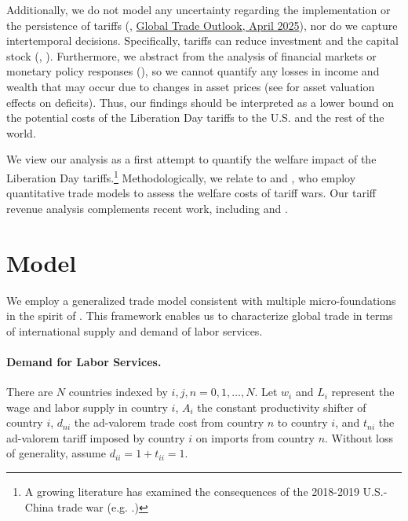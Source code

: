 \documentclass[12pt]{article}
\begin{document}
Additionally, we do not model any uncertainty regarding the implementation or the persistence of tariffs (\citet{alessandria2025trade}, \href{https://www.wto.org/english/res_e/booksp_e/trade_outlook25_e.pdf}{Global Trade Outlook, April 2025}), nor do we capture intertemporal decisions. Specifically, tariffs can reduce investment and the capital stock (\citet{cunat2024bilateral}, \citet{ NBERw33702}). Furthermore, we abstract from the analysis of financial markets or monetary policy responses (\citet{bianchi,sebnem, monacelli2025tariffs}), so we cannot quantify any losses in income and wealth that may occur due to changes in asset prices (see \citet{oleg_dima_deficit} for asset valuation effects on deficits). Thus, our findings should be interpreted as a lower bound on the potential costs of the Liberation Day tariffs to the U.S. and the rest of the world. 

We view our analysis as a first attempt to quantify the welfare impact of the Liberation Day tariffs.\footnote{A growing literature has examined the consequences of the 2018-2019 U.S.-China trade war (e.g. \citet{amiti2019impact,amiti2020s, flaaen2019disentangling,waugh2019consumption,fajgelbaum2020return,ma2021eye,ma2025tariffs,caliendo2023lessons}.)} Methodologically, we relate to \cite{Ossa} and \cite{Lashkaripour_tariff_war}, who employ quantitative trade models to assess the welfare costs of tariff wars. Our tariff revenue analysis complements recent work, including \cite{Lashkaripour_jeea} and \cite{Alessandria_revenue2025}.

\section{Model}
We employ a generalized trade model consistent with multiple micro-foundations in the spirit of \citet{demidova2024small}. This framework enables us to characterize global trade in terms of international supply and demand of labor services. 

\paragraph{Demand for Labor Services.}
There are $N $ countries indexed by $i,j,n = 0,1,\dots,N$. Let $w_i$ and $L_i$ represent the wage and labor supply in country $i$, $A_i$ the constant productivity shifter of country $i$, $d_{ni}$ the ad-valorem trade cost from country $n$ to country $i$, and $t_{ni}$ the ad-valorem tariff imposed by country $i$ on imports from country $n$. Without loss of generality, assume $d_{ii} = 1+t_{ii} = 1$. 
\end{document}
